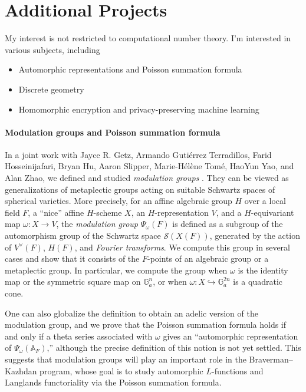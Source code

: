 \documentclass[letterpaper, 10pt]{article}
\begin{document}
\section{Additional Projects}

My interest is not restricted to computational number theory. I'm interested in various subjects, including
\begin{itemize}
    \item Automorphic representations and Poisson summation formula
    \item Discrete geometry
    \item Homomorphic encryption and privacy-preserving machine learning
\end{itemize}


\paragraph{Modulation groups and Poisson summation formula}

In a joint work with Jayce R. Getz, Armando Guti\'errez Terradillos, Farid Hosseinijafari, Bryan Hu, Aaron Slipper, Marie-H\'el\`ene Tom\'e, HaoYun Yao, and Alan Zhao, we defined and studied \emph{modulation groups} \cite{getz2025modulation}.
They can be viewed as generalizations of metaplectic groups acting on suitable Schwartz spaces of spherical varieties. 
More precisely, for an affine algebraic group $H$ over a local field $F$, a ``nice'' affine $H$-scheme $X$, an $H$-representation $V$, and a $H$-equivariant map $\omega : X \to V$, the \emph{modulation group} $\Psi_\omega(F)$ is defined as a subgroup of the automorphism group of the Schwartz space $\mathcal{S}(X(F))$, generated by the action of $V^\vee(F)$, $H(F)$, and \emph{Fourier transforms}.
We compute this group in several cases and show that it consists of the $F$-points of an algebraic group or a metaplectic group.
In particular, we compute the group when $\omega$ is the identity map or the symmetric square map on $\mathbb{G}_a^n$, or when $\omega : X \hookrightarrow \mathbb{G}_a^{2n}$ is a quadratic cone.

One can also globalize the definition to obtain an adelic version of the modulation group, and we prove that the Poisson summation formula holds if and only if a theta series associated with $\omega$ gives an ``automorphic representation of $\Psi_\omega(\mathbb{A}_F)$,'' although the precise definition of this notion is not yet settled.
This suggests that modulation groups will play an important role in the Braverman--Kazhdan program, whose goal is to study automorphic $L$-functions and Langlands functoriality via the Poisson summation formula.
\end{document}
